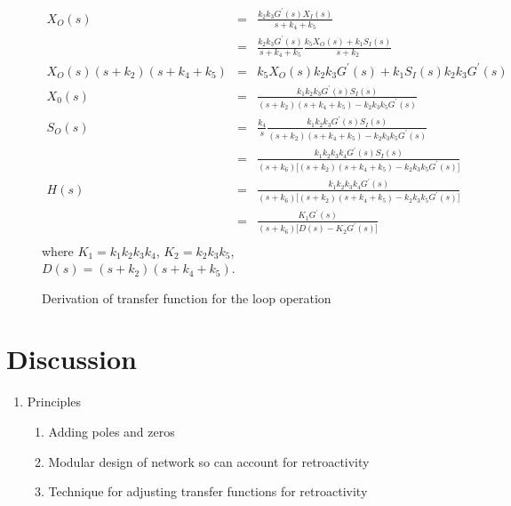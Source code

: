 \documentclass[unnumsec,webpdf,contemporary,large]{oup-authoring-template}%
\theoremstyle{thmstyleone}%
\theoremstyle{thmstyletwo}%
\theoremstyle{thmstylethree}%
\begin{document}
\begin{figure}
\begin{eqnarray}
X_O (s) & = & \frac{k_2 k_3  G^{\prime} (s) X_I(s)}{s + k_4 + k_5}  \nonumber \\
  &= &  \frac{k_2 k_3  G^{\prime} (s)}{s + k_4 + k_5} \frac{k_5 X_O(s) + k_1 S_I (s)}{s + k_2} \nonumber \\
X_O (s) (s + k_2) (s + k_4 + k_5)  & = &
  k_5 X_O(s) k_2 k_3  G^{\prime}(s) + k_1 S_I (s) k_2 k_3 G^{\prime}(s) \nonumber \\
X_0 (s) & = & \frac{ k_1  k_2 k_3 G^{\prime}(s) S_I (s)}
{(s + k_2) (s + k_4 + k_5) - k_2 k_3 k_5 G^{\prime} (s) } \nonumber \\
S_O (s) & = & \frac{k_4}{s} \frac{ k_1  k_2 k_3 G^{\prime}(s) S_I (s)}
  {(s + k_2) (s + k_4 + k_5) - k_2 k_3 k_5 G^{\prime}(s)} \nonumber \\
   & = & \frac{ k_1  k_2 k_3 k_4 G^{\prime}(s) S_I (s)}
  {(s + k_6) \lbrack (s + k_2) (s + k_4 + k_5) - k_2 k_3 k_5 G^{\prime} (s) \rbrack } \nonumber \\
H(s) & = & \frac{ k_1  k_2 k_3 k_4 G^{\prime} (s)}
  {(s + k_6) \lbrack (s + k_2) (s + k_4 + k_5) - k_2 k_3 k_5 G^{\prime} (s) \rbrack } \nonumber \\
  & = & \frac{ K_1 G^{\prime} (s)}
  {(s + k_6) \lbrack D(s) - K_2 G^{\prime} (s)\rbrack  } \nonumber \\
\end{eqnarray}
where $K_1 = k_1 k_2 k_3 k_4$, $K_2 = k_2 k_3 k_5$, $D(s) = (s + k_2) (s + k_4 + k_5)$.
\caption{Derivation of transfer function for the loop operation}\label{fig:loop-derivation}
\end{figure}

\section{Discussion}\label{discussion}
\begin{enumerate}

\item
Principles
\begin{enumerate}
\item 
Adding poles and zeros
\item
Modular design of network so can account for retroactivity
\item
Technique for adjusting transfer functions for retroactivity
\end{enumerate}

\end{enumerate}
\end{document}
